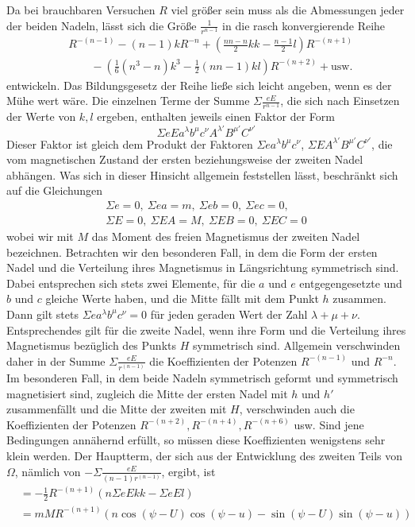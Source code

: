Da bei brauchbaren Versuchen $R$ viel größer sein muss als die Abmessungen jeder der beiden Nadeln, lässt sich die Größe $\frac1{r^{n-1}}$ in die rasch konvergierende Reihe
\[
\begin{aligned}
&R^{-(n-1)}-(n-1)kR^{-n}+\left(\frac{nn-n}{2}kk-\frac{n-1}{2}l\right)R^{-(n+1)}\\
&\qquad-\left(\tfrac16(n^3-n)k^3-\tfrac12(nn-1)kl\right)R^{-(n+2)}+\text{usw.}
\end{aligned}
\]
entwickeln. Das Bildungsgesetz der Reihe ließe sich leicht angeben, wenn es der Mühe wert wäre. Die einzelnen Terme der Summe $\Sigma\frac{eE}{r^{n-1}}$, die sich nach Einsetzen der Werte von $k,l$ ergeben, enthalten jeweils einen Faktor der Form
\[
\Sigma eEa^\lambda b^\mu c^\nu A^{\lambda'}B^{\mu'}C^{\nu'}
\]
Dieser Faktor ist gleich dem Produkt der Faktoren $\Sigma ea^\lambda b^\mu c^\nu$, $\Sigma EA^{\lambda'}B^{\mu'}C^{\nu'}$, die vom magnetischen Zustand der ersten beziehungsweise der zweiten Nadel abhängen. Was sich in dieser Hinsicht allgemein feststellen lässt, beschränkt sich auf die Gleichungen
\[
\begin{gathered}
\Sigma e=0,\ \Sigma ea=m,\ \Sigma eb=0,\ \Sigma ec=0,\\
\Sigma E=0,\ \Sigma EA=M,\ \Sigma EB=0,\ \Sigma EC=0
\end{gathered}
\]
wobei wir mit $M$ das Moment des freien Magnetismus der zweiten Nadel bezeichnen. Betrachten wir den besonderen Fall, in dem die Form der ersten Nadel und die Verteilung ihres Magnetismus in Längsrichtung symmetrisch sind. Dabei entsprechen sich stets zwei Elemente, für die $a$ und $e$ entgegengesetzte und $b$ und $c$ gleiche Werte haben, und die Mitte fällt mit dem Punkt $h$ zusammen. Dann gilt stets $\Sigma ea^\lambda b^\mu c^\nu=0$ für jeden geraden Wert der Zahl $\lambda+\mu+\nu$. Entsprechendes gilt für die zweite Nadel, wenn ihre Form und die Verteilung ihres Magnetismus bezüglich des Punkts $H$ symmetrisch sind. Allgemein verschwinden daher in der Summe $\Sigma\frac{eE}{r^{(n-1)}}$ die Koeffizienten der Potenzen $R^{-(n-1)}$ und $R^{-n}$. Im besonderen Fall, in dem beide Nadeln symmetrisch geformt und symmetrisch magnetisiert sind, zugleich die Mitte der ersten Nadel mit $h$ und $h'$ zusammenfällt und die Mitte der zweiten mit $H$, verschwinden auch die Koeffizienten der Potenzen $R^{-(n+2)},R^{-(n+4)},R^{-(n+6)}$ usw. Sind jene Bedingungen annähernd erfüllt, so müssen diese Koeffizienten wenigstens sehr klein werden. Der Hauptterm, der sich aus der Entwicklung des zweiten Teils von $\Omega$, nämlich von $-\Sigma\frac{eE}{(n-1)r^{(n-1)}}$, ergibt, ist
\[
\begin{aligned}
&=-\tfrac12 R^{-(n+1)}(n\Sigma eEkk-\Sigma eEl)\\
&=mMR^{-(n+1)}(n\cos(\psi-U)\cos(\psi-u)-\sin(\psi-U)\sin(\psi-u))
\end{aligned}
\]

